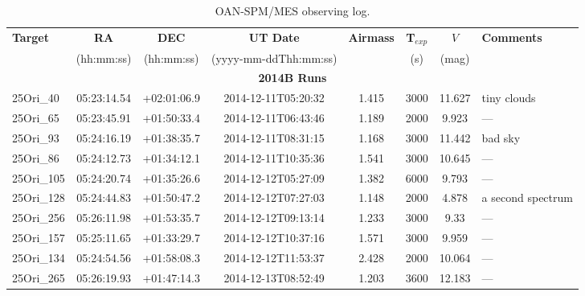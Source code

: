 \documentclass[12pt]{article}
\begin{document}
\begin{table} \tiny
\begin{center}
 \caption[OAN-SPM/MES observing log]{OAN-SPM/MES observing log.}
 \label{tab:MES_log}
 \begin{threeparttable}
  	\setlength{\tabcolsep}{11pt}
	\begin{tabular}{lccccccl}
	\toprule
	{\bf Target} & {\bf RA}    & {\bf DEC}    & {\bf UT Date}        & {\bf Airmass} & {\bf T$_{exp}$} & $V$     &  {\bf Comments} \\
	             & (hh:mm:ss)  & (hh:mm:ss)   &(yyyy-mm-ddThh:mm:ss) &               & (s)             & (mag)   &                 \\
	\midrule
	\multicolumn{8}{c}{{\bf 2014B Runs}} \\
	25Ori\_40     & 05:23:14.54 & +02:01:06.9 & 2014-12-11T05:20:32  & 1.415         & 3000             & 11.627 & tiny clouds              \\
	25Ori\_65     & 05:23:45.91 & +01:50:33.4 & 2014-12-11T06:43:46  & 1.189         & 2000             & 9.923  & ---                      \\
	25Ori\_93     & 05:24:16.19 & +01:38:35.7 & 2014-12-11T08:31:15  & 1.168         & 3000             & 11.442 & bad sky                  \\
	25Ori\_86     & 05:24:12.73 & +01:34:12.1 & 2014-12-11T10:35:36  & 1.541         & 3000             & 10.645 & ---                      \\
	25Ori\_105    & 05:24:20.74 & +01:35:26.6 & 2014-12-12T05:27:09  & 1.382         & 6000             & 9.793  & ---                      \\
	25Ori\_128    & 05:24:44.83 & +01:50:47.2 & 2014-12-12T07:27:03  & 1.148         & 2000             & 4.878  & a second spectrum 		\\
	25Ori\_256    & 05:26:11.98 & +01:53:35.7 & 2014-12-12T09:13:14  & 1.233         & 3000             & 9.33   & ---                      \\
	25Ori\_157    & 05:25:11.65 & +01:33:29.7 & 2014-12-12T10:37:16  & 1.571         & 3000             & 9.959  & ---                      \\
	25Ori\_134    & 05:24:54.56 & +01:58:08.3 & 2014-12-12T11:53:37  & 2.428         & 2000             & 10.064 & ---                      \\
	25Ori\_265    & 05:26:19.93 & +01:47:14.3 & 2014-12-13T08:52:49  & 1.203         & 3600             & 12.183 & ---                      \\

\end{tabular}
\end{threeparttable}
\end{center}
\end{table}
\end{document}
